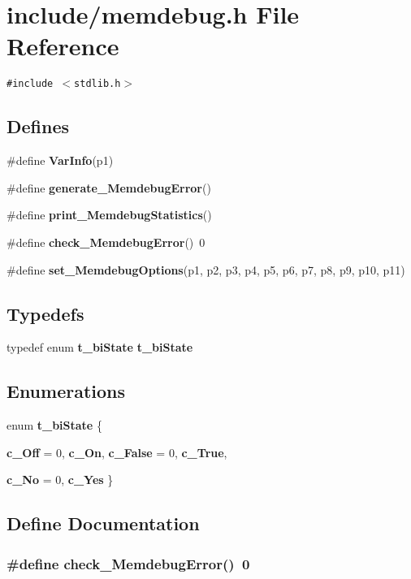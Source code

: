 \section{include/memdebug.h File Reference}
\label{memdebug_8h}
{\tt \#include $<$stdlib.h$>$}\par
\subsection*{Defines}
\begin{CompactItemize}
\item 
\#define {\bf Var\-Info}(p1)
\item 
\#define {\bf generate\_\-Memdebug\-Error}()
\item 
\#define {\bf print\_\-Memdebug\-Statistics}()
\item 
\#define {\bf check\_\-Memdebug\-Error}()~0
\item 
\#define {\bf set\_\-Memdebug\-Options}(p1, p2, p3, p4, p5, p6, p7, p8, p9, p10, p11)
\end{CompactItemize}
\subsection*{Typedefs}
\begin{CompactItemize}
\item 
typedef enum {\bf t\_\-bi\-State} {\bf t\_\-bi\-State}
\end{CompactItemize}
\subsection*{Enumerations}
\begin{CompactItemize}
\item 
enum {\bf t\_\-bi\-State} \{ \par
{\bf c\_\-Off} =  0, 
{\bf c\_\-On}, 
{\bf c\_\-False} =  0, 
{\bf c\_\-True}, 
\par
{\bf c\_\-No} =  0, 
{\bf c\_\-Yes}
 \}
\end{CompactItemize}


\subsection{Define Documentation}
\subsubsection{\setlength{\rightskip}{0pt plus 5cm}\#define check\_\-Memdebug\-Error()~0}\label{memdebug_8h_bfaf82b678ff34c221afaa319ff39692}


